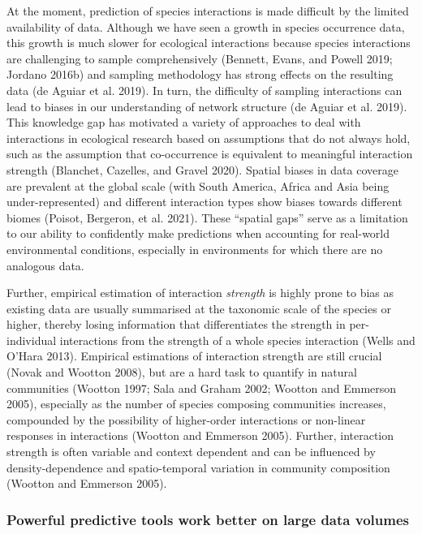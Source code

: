 \documentclass[10pt,oneside]{article}
\begin{document}
At the moment, prediction of species interactions is made difficult by
the limited availability of data. Although we have seen a growth in
species occurrence data, this growth is much slower for ecological
interactions because species interactions are challenging to sample
comprehensively (Bennett, Evans, and Powell 2019; Jordano 2016b) and
sampling methodology has strong effects on the resulting data (de Aguiar
et al. 2019). In turn, the difficulty of sampling interactions can lead
to biases in our understanding of network structure (de Aguiar et al.
2019). This knowledge gap has motivated a variety of approaches to deal
with interactions in ecological research based on assumptions that do
not always hold, such as the assumption that co-occurrence is equivalent
to meaningful interaction strength (Blanchet, Cazelles, and Gravel
2020). Spatial biases in data coverage are prevalent at the global scale
(with South America, Africa and Asia being under-represented) and
different interaction types show biases towards different biomes
(Poisot, Bergeron, et al. 2021). These ``spatial gaps'' serve as a
limitation to our ability to confidently make predictions when
accounting for real-world environmental conditions, especially in
environments for which there are no analogous data.

Further, empirical estimation of interaction \emph{strength} is highly
prone to bias as existing data are usually summarised at the taxonomic
scale of the species or higher, thereby losing information that
differentiates the strength in per-individual interactions from the
strength of a whole species interaction (Wells and O'Hara 2013).
Empirical estimations of interaction strength are still crucial (Novak
and Wootton 2008), but are a hard task to quantify in natural
communities (Wootton 1997; Sala and Graham 2002; Wootton and Emmerson
2005), especially as the number of species composing communities
increases, compounded by the possibility of higher-order interactions or
non-linear responses in interactions (Wootton and Emmerson 2005).
Further, interaction strength is often variable and context dependent
and can be influenced by density-dependence and spatio-temporal
variation in community composition (Wootton and Emmerson 2005).

\hypertarget{powerful-predictive-tools-work-better-on-large-data-volumes}{%
\subsubsection{Powerful predictive tools work better on large data
volumes}\label{powerful-predictive-tools-work-better-on-large-data-volumes}}
\end{document}
